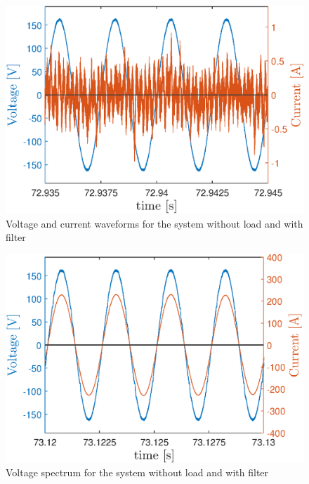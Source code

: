 \begin{figure}[!h] %
	\centering
	\includegraphics[width=0.27\textheight]{Figures/artigo_filt_1.eps}
	\caption{Voltage and current waveforms for the system without load and with filter}
	\label{fig:artigo_filt_1.eps}
\end{figure}

\begin{figure}[!h] %
	\centering
	\includegraphics[width=0.27\textheight]{Figures/artigo_filt_2.eps}
	\caption{Voltage spectrum for the system without load and with filter}
	\label{fig:artigo_filt_2.eps}
\end{figure}

